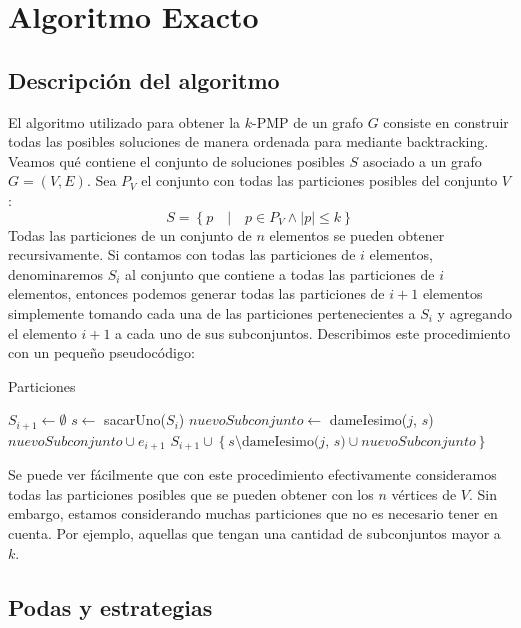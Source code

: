 \section{Algoritmo Exacto}

\subsection{Descripción del algoritmo}
El algoritmo utilizado para obtener la $k$-PMP de un grafo $G$ consiste en construir 
todas las posibles soluciones de manera ordenada para mediante backtracking.
Veamos qué contiene el conjunto de soluciones posibles $S$ asociado a un grafo $G = (V, E)$.
Sea $P_V$ el conjunto con todas las particiones posibles del conjunto $V$:
\begin{displaymath}
  S = \left\{p \quad | \quad p \in P_V \land \left\vert{p}\right\vert \leq k\right\}
\end{displaymath}
Todas las particiones de un conjunto de $n$ elementos se pueden obtener recursivamente. Si contamos
con todas las particiones de $i$ elementos, denominaremos $S_i$ al conjunto que contiene a todas las
particiones de $i$ elementos, entonces podemos generar todas las particiones de $i+1$ elementos simplemente 
tomando cada una de las particiones pertenecientes a $S_i$ y agregando el elemento $i+1$ a cada uno 
de sus subconjuntos. Describimos este procedimiento con un pequeño pseudocódigo:

\begin{algorithm}[H]
\begin{algorithmic}
\caption{Particiones}
  \STATE $S_{i+1}\gets \emptyset$
    \STATE $s\gets$ sacarUno($S_i$)
      \STATE $nuevoSubconjunto \gets $ dameIesimo($j$, $s$)
      \STATE $nuevoSubconjunto \cup e_{i+1}$
      \STATE $S_{i+1} \cup \left\{ s \setminus \text{dameIesimo(}j\text{, }s\text{)} \cup nuevoSubconjunto \right\}$
    \ENDFOR
  \ENDWHILE
\end{algorithmic}
\end{algorithm}

Se puede ver fácilmente que con este procedimiento efectivamente consideramos todas las particiones
posibles que se pueden obtener con los $n$ vértices de $V$. Sin embargo, estamos considerando muchas
particiones que no es necesario tener en cuenta. Por ejemplo, aquellas que tengan una cantidad de
subconjuntos mayor a $k$.

\subsection{Podas y estrategias}

